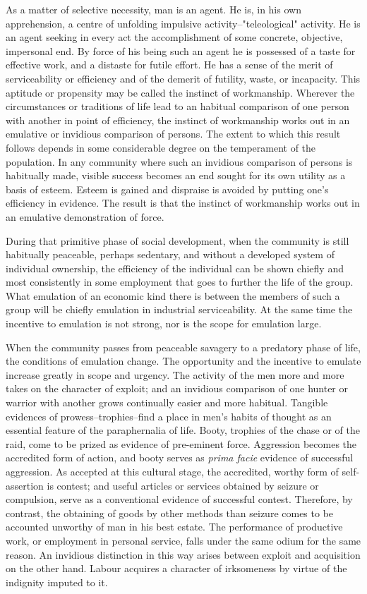 \documentclass[12pt]{report}
\begin{document}
As a matter of selective necessity, man is an agent. He is, in his own
apprehension, a centre of unfolding impulsive activity--"teleological"
activity. He is an agent seeking in every act the accomplishment of some
concrete, objective, impersonal end. By force of his being such an agent
he is possessed of a taste for effective work, and a distaste for futile
effort. He has a sense of the merit of serviceability or efficiency
and of the demerit of futility, waste, or incapacity. This aptitude
or propensity may be called the instinct of workmanship. Wherever the
circumstances or traditions of life lead to an habitual comparison
of one person with another in point of efficiency, the instinct of
workmanship works out in an emulative or invidious comparison of
persons. The extent to which this result follows depends in some
considerable degree on the temperament of the population. In any
community where such an invidious comparison of persons is habitually
made, visible success becomes an end sought for its own utility as a
basis of esteem. Esteem is gained and dispraise is avoided by putting
one's efficiency in evidence. The result is that the instinct of
workmanship works out in an emulative demonstration of force.

During that primitive phase of social development, when the community is
still habitually peaceable, perhaps sedentary, and without a developed
system of individual ownership, the efficiency of the individual can
be shown chiefly and most consistently in some employment that goes to
further the life of the group. What emulation of an economic kind there
is between the members of such a group will be chiefly emulation in
industrial serviceability. At the same time the incentive to emulation
is not strong, nor is the scope for emulation large.

When the community passes from peaceable savagery to a predatory phase
of life, the conditions of emulation change. The opportunity and the
incentive to emulate increase greatly in scope and urgency. The activity
of the men more and more takes on the character of exploit; and an
invidious comparison of one hunter or warrior with another grows
continually easier and more habitual. Tangible evidences of
prowess--trophies--find a place in men's habits of thought as an
essential feature of the paraphernalia of life. Booty, trophies of
the chase or of the raid, come to be prized as evidence of pre-eminent
force. Aggression becomes the accredited form of action, and booty
serves as \emph{prima facie} evidence of successful aggression. As accepted at
this cultural stage, the accredited, worthy form of self-assertion
is contest; and useful articles or services obtained by seizure or
compulsion, serve as a conventional evidence of successful contest.
Therefore, by contrast, the obtaining of goods by other methods than
seizure comes to be accounted unworthy of man in his best estate. The
performance of productive work, or employment in personal service, falls
under the same odium for the same reason. An invidious distinction
in this way arises between exploit and acquisition on the other hand.
Labour acquires a character of irksomeness by virtue of the indignity
imputed to it.
\end{document}
